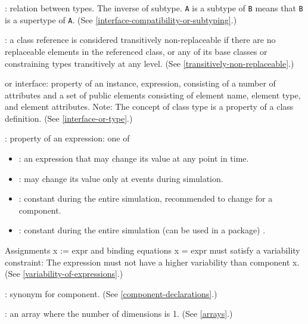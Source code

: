 : relation between types.  The inverse of subtype.  \lstinline!A! is a subtype of \lstinline!B! means that \lstinline!B! is a supertype of \lstinline!A!. (See \cref{interface-compatibility-or-subtyping}.)

: a class reference is considered
transitively non-replaceable if there are no replaceable elements in the
referenced class, or any of its base classes or constraining types
transitively at any level. (See \cref{transitively-non-replaceable}.)

 or interface: property of an instance, expression, consisting of a number of attributes and a set of public
elements consisting of element name, element type, and element
attributes. Note: The concept of class type is a property of a class
definition. (See \cref{interface-or-type}.)

: property of an expression: one of
\begin{itemize}
\item {}: an expression that may change its value at any
point in time.
\item {}: may change its value only at events during
simulation.
\item {}: constant during the entire simulation, recommended
to change for a component.
\item {}: constant during the entire simulation (can be used
in a package) .
\end{itemize}

Assignments x := expr and binding equations x = expr must satisfy a
variability constraint: The expression must not have a higher
variability than component x. (See \cref{variability-of-expressions}.)

: synonym for component. (See \cref{component-declarations}.)

: an array where the number of dimensions is 1. (See
\cref{arrays}.)
